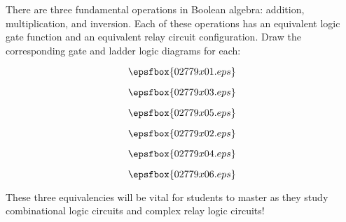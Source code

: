 

There are three fundamental operations in Boolean algebra: addition, multiplication, and inversion.  Each of these operations has an equivalent logic gate function and an equivalent relay circuit configuration.  Draw the corresponding gate and ladder logic diagrams for each:

$$\epsfbox{02779x01.eps}$$

\vskip 10pt

$$\epsfbox{02779x03.eps}$$

\vskip 10pt

$$\epsfbox{02779x05.eps}$$







$$\epsfbox{02779x02.eps}$$

\vskip 10pt

$$\epsfbox{02779x04.eps}$$

\vskip 10pt

$$\epsfbox{02779x06.eps}$$







These three equivalencies will be vital for students to master as they study combinational logic circuits and complex relay logic circuits!  




